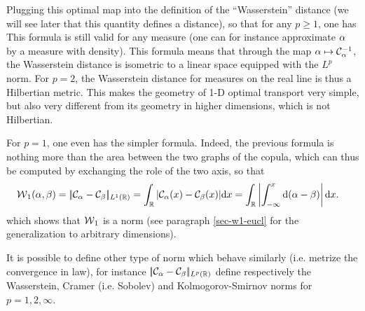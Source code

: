 Plugging this optimal map into the definition of the ``Wasserstein'' distance (we will see later that this quantity defines a distance), so that for any $p \geq 1$, one has
This formula is still valid for any measure (one can for instance approximate $\alpha$ by a measure with density). 
%
This formula means that through the map $\alpha \mapsto \mathcal{C}_{\alpha}^{-1}$, the Wasserstein distance is isometric to a linear space equipped with the $L^p$ norm. For $p=2$, the Wasserstein distance for measures on the real line is thus a Hilbertian metric. 
This makes the geometry of 1-D optimal transport very simple, but also very different from its geometry in higher dimensions, which is not Hilbertian.

For $p=1$, one even has the simpler formula. Indeed, the previous formula is nothing more than the area between the two graphs of the copula, which can thus be computed by exchanging the role of the two axis, so that 
\begin{align}\label{eq-w1-1d}
	\operatorname{\mathcal{W}}_1(\alpha,\beta) &= |\!|  \mathcal{C}_{\alpha} - \mathcal{C}_{\beta}  |\!|_{L^1(\mathbb{R})} = 
	\int_{\mathbb{R}} | \mathcal{C}_{\alpha}(x) - \mathcal{C}_{\beta}(x) | \mathrm{d} x 
	= \int_{\mathbb{R}} \left\lvert \int_{-\infty}^x \mathrm{d}(\alpha-\beta) \right\rvert \mathrm{d} x.
\end{align}
which shows that $\operatorname{\mathcal{W}}_1$ is a norm (see paragraph \ref{sec-w1-eucl} for the generalization to arbitrary dimensions). 

It is possible to define other type of norm which behave similarly (i.e. metrize the convergence in law), for instance $|\!|  \mathcal{C}_{\alpha} - \mathcal{C}_{\beta}  |\!|_{L^p(\mathbb{R})}$ define respectively the Wasserstein, Cramer (i.e. Sobolev) and Kolmogorov-Smirnov norms for $p=1,2,\infty$. 





